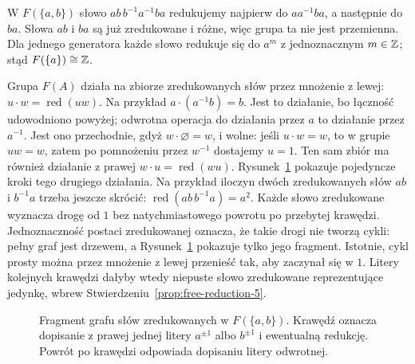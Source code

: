 \begin{przyklad}
\label{prz:redukcja-slow-5}
W $F(\{a,b\})$ słowo
$ab\,b^{-1}a^{-1}ba$
redukujemy najpierw do
$aa^{-1}ba$, a następnie
do $ba$. Słowa $ab$ i $ba$
są już zredukowane i różne,
więc grupa ta nie jest przemienna.
Dla jednego generatora każde słowo
redukuje się do $a^m$ z jednoznacznym
$m\in\mathbb{Z}$; stąd $F(\{a\})\cong\mathbb{Z}$.

Grupa $F(A)$ działa na zbiorze zredukowanych
słów przez mnożenie z lewej:
$u\cdot w=\operatorname{red}(uw)$.
Na przykład $a\cdot(a^{-1}b)=b$.
Jest to działanie, bo łączność udowodniono
powyżej; odwrotna operacja do działania
przez $a$ to działanie przez $a^{-1}$.
Jest ono przechodnie, gdyż $w\cdot\varnothing=w$,
i wolne: jeśli $u\cdot w=w$, to w grupie
$uw=w$, zatem po pomnożeniu przez $w^{-1}$
dostajemy $u=1$. Ten sam zbiór ma również
działanie z prawej $w\cdot u=\operatorname{red}(wu)$.
Rysunek~\ref{fig:free-words-5} pokazuje
pojedyncze kroki tego drugiego działania.
Na przykład iloczyn dwóch zredukowanych słów
$ab$ i $b^{-1}a$ trzeba jeszcze skrócić:
$\operatorname{red}(ab\,b^{-1}a)=a^2$.
Każde słowo zredukowane wyznacza drogę od $1$ bez natychmiastowego
powrotu po przebytej krawędzi. Jednoznaczność postaci zredukowanej
oznacza, że takie drogi nie tworzą cykli: pełny graf jest drzewem,
a Rysunek~\ref{fig:free-words-5} pokazuje tylko jego fragment.
Istotnie, cykl prosty można przez mnożenie z lewej przenieść tak,
aby zaczynał się w $1$. Litery kolejnych krawędzi dałyby wtedy
niepuste słowo zredukowane reprezentujące jedynkę, wbrew
Stwierdzeniu~\ref{prop:free-reduction-5}.
\end{przyklad}

\begin{figure}[htbp]
\centering
{}
\caption{Fragment grafu słów zredukowanych w
$F(\{a,b\})$. Krawędź oznacza dopisanie
z prawej jednej litery $a^{\pm1}$ albo $b^{\pm1}$
i ewentualną redukcję. Powrót po krawędzi
odpowiada dopisaniu litery odwrotnej.}
\label{fig:free-words-5}
\end{figure}

